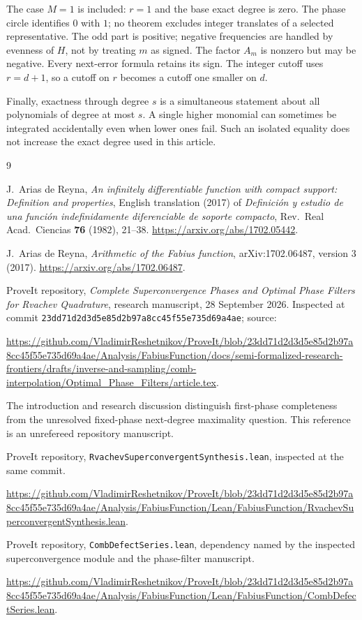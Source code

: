 \documentclass[11pt,a4paper]{article}
\numberwithin{equation}{section}
\theoremstyle{plain}
\theoremstyle{definition}
\theoremstyle{remark}
\newcommand{\code}[1]{\texttt{\small #1}}
\begin{document}
The case $M=1$ is included: $r=1$ and the base exact degree is zero.
The phase circle identifies $0$ with $1$; no theorem excludes integer
translates of a selected representative. The odd part is positive; negative
frequencies are handled by evenness of $H$, not by treating $m$ as signed.
The factor $A_m$ is nonzero but may be negative. Every next-error formula
retains its sign. The integer cutoff uses $r=d+1$, so a cutoff on $r$
becomes a cutoff one smaller on $d$.

Finally, exactness through degree $s$ is a simultaneous statement about
all polynomials of degree at most $s$. A single higher monomial can
sometimes be integrated accidentally even when lower ones fail. Such an
isolated equality does not increase the exact degree used in this article.

\begin{thebibliography}{9}

J.~Arias de Reyna,
\emph{An infinitely differentiable function with compact support:
Definition and properties}, English translation (2017) of
\emph{Definici\'on y estudio de una funci\'on indefinidamente diferenciable
de soporte compacto}, Rev.~Real Acad.~Ciencias \textbf{76} (1982), 21--38.
\url{https://arxiv.org/abs/1702.05442}.

J.~Arias de Reyna,
\emph{Arithmetic of the Fabius function}, arXiv:1702.06487, version 3 (2017).
\url{https://arxiv.org/abs/1702.06487}.

ProveIt repository,
\emph{Complete Superconvergence Phases and Optimal Phase Filters for
Rvachev Quadrature}, research manuscript, 28 September 2026.
Inspected at commit
\texttt{23dd71d2d3d5e85d2b97a8cc45f55e735d69a4ae}; source:
\begin{small}
\url{https://github.com/VladimirReshetnikov/ProveIt/blob/23dd71d2d3d5e85d2b97a8cc45f55e735d69a4ae/Analysis/FabiusFunction/docs/semi-formalized-research-frontiers/drafts/inverse-and-sampling/comb-interpolation/Optimal_Phase_Filters/article.tex}.
\end{small}
The introduction and research discussion distinguish first-phase
completeness from the unresolved fixed-phase next-degree maximality
question. This reference is an unrefereed repository manuscript.

ProveIt repository,
\code{RvachevSuperconvergentSynthesis.lean}, inspected at the same commit.
\begin{small}
\url{https://github.com/VladimirReshetnikov/ProveIt/blob/23dd71d2d3d5e85d2b97a8cc45f55e735d69a4ae/Analysis/FabiusFunction/Lean/FabiusFunction/RvachevSuperconvergentSynthesis.lean}.
\end{small}

ProveIt repository,
\code{CombDefectSeries.lean}, dependency named by the inspected
superconvergence module and the phase-filter manuscript.
\begin{small}
\url{https://github.com/VladimirReshetnikov/ProveIt/blob/23dd71d2d3d5e85d2b97a8cc45f55e735d69a4ae/Analysis/FabiusFunction/Lean/FabiusFunction/CombDefectSeries.lean}.
\end{small}

\end{thebibliography}
\end{document}
